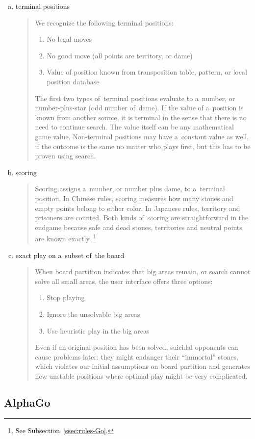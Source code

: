 \begin{enumerate}[(a)]
  \item terminal positions
    \begin{quotation}
      \noindent
      We recognize the following terminal positions:
      \begin{enumerate}[$\diamondsuit$]
        \item No legal moves
        \item No good move (all points are territory, or dame)
        \item Value of position known from transposition table, pattern, or local position database
      \end{enumerate}
      The first two types of~terminal positions evaluate to a~number, or number-plus-star (odd
      number of~dame).
      If the value of a~position is known from another source, it is terminal in the sense that there is no need to continue search.
      The value itself can be any mathematical game value.
      Non-terminal positions may have a~constant value as well, if the outcome is the same no matter who plays first, but this has to be proven using search.
    \end{quotation}

  \item scoring
    \begin{quotation}
      Scoring assigns a~number, or number plus dame, to a~terminal position.
      In Chinese rules, scoring measures how many stones and empty points belong to either color.
      In Japanese rules, territory and prisoners are counted.
      Both kinds of~scoring are straightforward in the endgame because safe and dead stones, territories and neutral points are known exactly.%
      \footnote{See Subsection~\ref{ssec:rules-Go}.}
    \end{quotation}

  \item exact play on a~subset of~the board
    \begin{quotation}
      When board partition indicates that big areas remain, or search cannot solve all small areas, the user interface offers three options:
      \begin{enumerate}[$\diamondsuit$]
        \item Stop playing
        \item Ignore the unsolvable big areas
        \item Use heuristic play in the big areas
      \end{enumerate}
      Even if an original position has been solved, suicidal opponents can cause problems later:
      they might endanger their ``immortal'' stones, which violates our initial assumptions on board partition and generates new unstable positions where optimal play might be very complicated.
    \end{quotation}

\end{enumerate}

\subsection{AlphaGo}
\label{ssec:AlphaGo}
\todo
